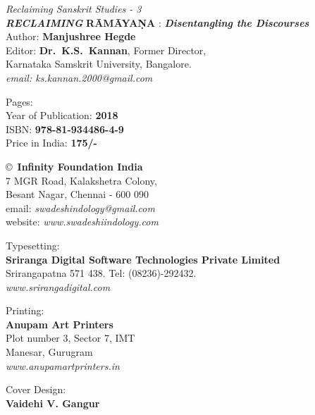 \thispagestyle{empty}
\noindent
{\fontsize{9}{11}\selectfont\sl Reclaiming Sanskrit Studies - 3}\\
{\sl\bfseries RECLAIMING} {\bf RĀMĀYAṆA} : {\sl\bfseries Disentangling the Discourses}\\[1pt] 
Author: {\bf Manjushree Hegde}\\[9pt]
Editor: {\bf Dr.\ K.S.\ Kannan}, Former Director,\\ 
Karnataka Samskrit University, Bangalore.\\
{\sl email: ks.kannan.2000@gmail.com}
\vfill

\noindent
Pages: {\bf \pageref{book:end}}\\
Year of Publication: {\bf 2018}\\
ISBN: {\bf 978-81-934486-4-9}\\
Price in India: {\bf 175/-}
\vfill

\noindent
\copyright\ {\bf Infinity Foundation India}\\ 
7 MGR Road, Kalakshetra Colony,\\ 
Besant Nagar, Chennai - 600 090\\
email: {\sl swadeshindology@gmail.com}\\
website: {\sl www.swadeshiindology.com} 
\vfill

\noindent
Typesetting:\\
{\bf Sriranga Digital Software Technologies Private Limited}\\ 
Srirangapatna 571 438. Tel: (08236)-292432.\\
{\sl www.srirangadigital.com}\\

\vfill

\noindent
Printing:\\
{\bf Anupam Art Printers}\\
Plot number 3, Sector 7, IMT\\
Manesar, Gurugram\\
{\sl www.anupamartprinters.in}

\vfill
\noindent
Cover Design:\\
{\bf Vaidehi V. Gangur}
